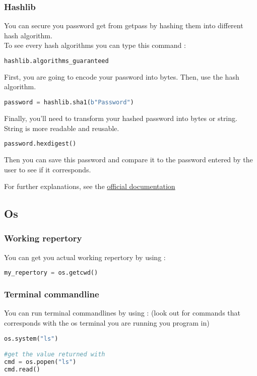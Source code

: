 \documentclass[a4paper, 12pt, titlepage]{scrartcl} %
\begin{document}
\subsubsection{Hashlib}
You can secure you password get from getpass by hashing them into different hash algorithm.\\
To see every hash algorithms you can type this command : 
\begin{lstlisting}[language=Python]
hashlib.algorithms_guaranteed
\end{lstlisting} \vspace{5mm}
First, you are going to encode your password into bytes. Then, use the hash algorithm.
\begin{lstlisting}[language=Python]
password = hashlib.sha1(b"Password")
\end{lstlisting} \vspace{5mm}
Finally, you'll need to transform your hashed password into bytes or string. String is more readable and reusable.
\begin{lstlisting}[language=Python]
password.hexdigest()
\end{lstlisting} \vspace{5mm}
Then you can save this password and compare it to the password entered by the user to see if it corresponds.

\vspace{5mm}

For further explanations, see the \href{https://docs.python.org/3/library/hashlib.html}{official documentation}


\subsection{Os}
\subsubsection{Working repertory}
You can get you actual working repertory by using :
\begin{lstlisting}[language=Python]
my_repertory = os.getcwd()
\end{lstlisting} \vspace{5mm}

\subsubsection{Terminal commandline}
You can run terminal commandlines by using : (look out for commands that corresponds with the os terminal you are running you program in)
\begin{lstlisting}[language=Python]
os.system("ls")

#get the value returned with
cmd = os.popen("ls")
cmd.read()
\end{lstlisting} \vspace{5mm}
\end{document}
